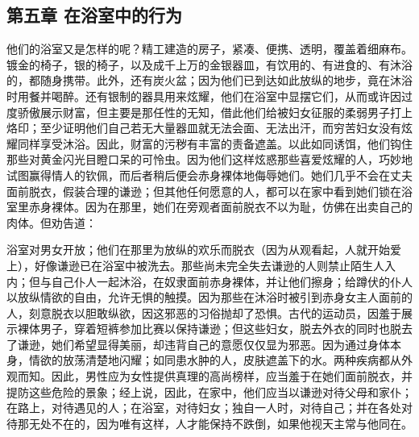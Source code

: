
\subsection{第五章 在浴室中的行为}

他们的浴室又是怎样的呢？精工建造的房子，紧凑、便携、透明，覆盖着细麻布。镀金的椅子，银的椅子，以及成千上万的金银器皿，有饮用的、有进食的、有沐浴的，都随身携带。此外，还有炭火盆；因为他们已到达如此放纵的地步，竟在沐浴时用餐并喝醉。还有银制的器具用来炫耀，他们在浴室中显摆它们，从而或许因过度骄傲展示财富，但主要是那任性的无知，借此他们给被妇女征服的柔弱男子打上烙印；至少证明他们自己若无大量器皿就无法会面、无法出汗，而穷苦妇女没有炫耀同样享受沐浴。因此，财富的污秽有丰富的责备遮盖。以此如同诱饵，他们钩住那些对黄金闪光目瞪口呆的可怜虫。因为他们这样炫惑那些喜爱炫耀的人，巧妙地试图赢得情人的钦佩，而后者稍后便会赤身裸体地侮辱她们。她们几乎不会在丈夫面前脱衣，假装合理的谦逊；但其他任何愿意的人，都可以在家中看到她们锁在浴室里赤身裸体。因为在那里，她们在旁观者面前脱衣不以为耻，仿佛在出卖自己的肉体。但劝告道：\par

\par

浴室对男女开放；他们在那里为放纵的欢乐而脱衣（因为从观看起，人就开始爱上），好像谦逊已在浴室中被洗去。那些尚未完全失去谦逊的人则禁止陌生人入内；但与自己仆人一起沐浴，在奴隶面前赤身裸体，并让他们擦身；给蹲伏的仆人以放纵情欲的自由，允许无惧的触摸。因为那些在沐浴时被引到赤身女主人面前的人，刻意脱衣以胆敢纵欲，因这邪恶的习俗抛却了恐惧。古代的运动员，因羞于展示裸体男子，穿着短裤参加比赛以保持谦逊；但这些妇女，脱去外衣的同时也脱去了谦逊，她们希望显得美丽，却违背自己的意愿仅仅显为邪恶。因为通过身体本身，情欲的放荡清楚地闪耀；如同患水肿的人，皮肤遮盖下的水。两种疾病都从外观而知。因此，男性应为女性提供真理的高尚榜样，应当羞于在她们面前脱衣，并提防这些危险的景象；经上说，因此，在家中，他们应当以谦逊对待父母和家仆；在路上，对待遇见的人；在浴室，对待妇女；独自一人时，对待自己；并在各处对待那无处不在的，因为唯有这样，人才能保持不跌倒，如果他视天主常与他同在。\par


